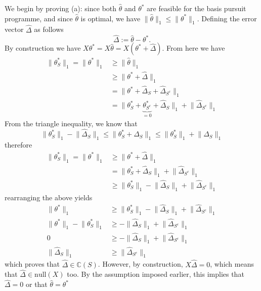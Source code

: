 \documentclass[10pt,handout,english]{beamer}
\newcommand{\C}{\mathbb{C}}
\begin{document}
\begin{frame}[allowframebreaks]
We begin by proving (a): since both $\hat{\theta}$ and $\theta^{*}$ are feasible for the basis pursuit programme, and since $\hat{\theta}$ is optimal, we have $\lVert\hat{\theta}\rVert_{1}\leq\lVert\theta^{*}\rVert_{1}$. Defining the error vector $\hat{\Delta}$ as follows
\[
\hat{\Delta}:=\hat{\theta}-\theta^{*}.
\]
By construction we have $X\theta^*=X\hat{\theta}=X(\theta^*+\hat{\Delta})$. From here we have
\begin{align*}
\lVert\theta_{S}^{*}\lVert_{1}=\lVert\theta^{*}\lVert_{1}&\geq\lVert \hat{\theta}\rVert_1\\
&\geq\lVert\theta^{*}+\hat{\Delta}\rVert_{1}\\
&=\lVert\theta^{*}+\hat{\Delta}_{S}+\hat{\Delta}_{S^{c}}\rVert_{1}\\
&=\lVert\theta_{S}^{*}+\underbrace{\theta_{S^c}^{*}}_{=0}+\hat{\Delta}_{S}\rVert_1+\lVert\hat{\Delta}_{S^{c}}\rVert_{1}
\end{align*}
From the triangle inequality, we know that
\[
\lVert\theta_{S}^{*}\rVert_{1}-\lVert\hat{\Delta}_{S}\rVert_{1}\leq\lVert\theta_{S}^{*}+\hat{\Delta}_{S}\rVert_{1}\leq\lVert\theta_{S}^{*}\rVert_1+\lVert\hat{\Delta}_{S}\rVert_{1}
\]
therefore
\begin{align*}
\lVert\theta_{S}^{*}\lVert_{1}=\lVert\theta^{*}\lVert_{1}&\geq\lVert\theta^{*}+\hat{\Delta}\rVert_{1}\\
&=\lVert\theta_{S}^{*}+\hat{\Delta}_{S}\rVert_{1}+\lVert\hat{\Delta}_{S^{c}}\rVert_{1}\\
&\geq\lVert\theta_{S}^{*}\rVert_{1}-\lVert\hat{\Delta}_{S}\rVert_{1}+\lVert\hat{\Delta}_{S^{c}}\rVert_{1}
\end{align*}
rearranging the above yields
\begin{align*}
\lVert\theta^{*}\rVert_{1}&\geq\lVert\theta_{S}^{*}\rVert_{1}-\lVert\hat{\Delta}_{S}\rVert_{1}+\lVert\hat{\Delta}_{S^{c}}\rVert_{1}\\
\lVert\theta^{*}\rVert_{1}-\lVert\theta_{S}^{*}\rVert_{1}&\geq-\lVert\hat{\Delta}_{S}\rVert_{1}+\lVert\hat{\Delta}_{S^{c}}\rVert_{1}\\
0&\geq-\lVert\hat{\Delta}_{S}\rVert_{1}+\lVert\hat{\Delta}_{S^{c}}\rVert_{1}\\
\lVert\hat{\Delta}_{S}\rVert_{1}&\geq	\lVert\hat{\Delta}_{S^{c}}\rVert_{1}
\end{align*}
which proves that $\hat{\Delta}\in\C(S)$. However, by construction, $X\hat{\Delta}=0$, which means that $\hat{\Delta}\in\text{null}(X)$ too. By the assumption imposed earlier, this implies that $\hat{\Delta}=0$ or that $\hat{\theta}=\theta^{*}$
\end{frame}
\end{document}
